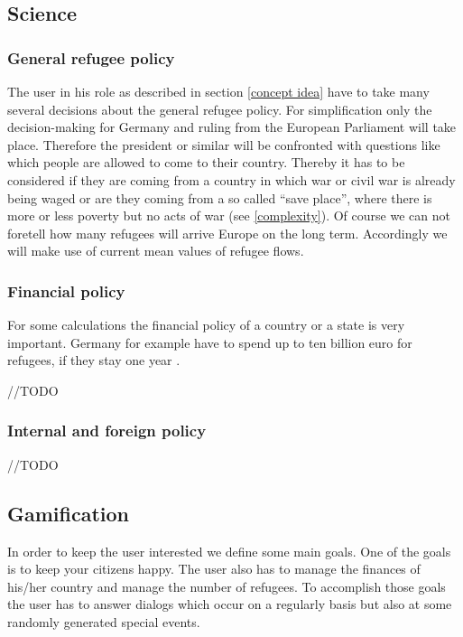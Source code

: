 \documentclass{acm_proc_article-sp}
\begin{document}
\subsection{Science}
\subsubsection*{\textbf{General refugee policy}}
The user in his role as described in section \ref{concept idea} have to take many several decisions about the general refugee policy. For simplification only the decision-making for Germany and ruling from the European Parliament will take place. Therefore the president or similar will be confronted with questions like which people are allowed to come to their country. Thereby it has to be considered if they are coming from a country in which war or civil war is already being waged or are they coming from a so called ``save place'', where there is more or less poverty but no acts of war (see \ref{complexity}). Of course we can not foretell how many refugees will arrive Europe on the long term. Accordingly we will make use of current mean values of refugee flows. 


\subsubsection*{\textbf{Financial policy}}
For some calculations the financial policy of a country or a state is very important. Germany for example have to spend up to ten billion euro for refugees, if they stay one year \cite{finanzen}. 

//TODO


\subsubsection*{\textbf{Internal and foreign policy}} //TODO



\subsection{Gamification}
\label{gamification}
In order to keep the user interested we define some main goals. One of the goals is to keep your citizens happy. The user also has to manage the finances of his/her country and manage the number of refugees. To accomplish those goals the user has to answer dialogs which occur on a regularly basis but also at some randomly generated special events. 
\end{document}
